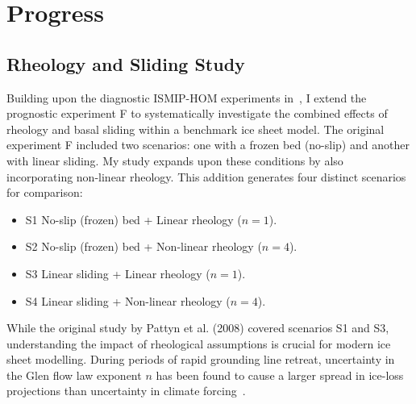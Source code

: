 \chapter{Progress}\label{progress}
\section{Rheology and Sliding Study}\label{study1}
Building upon the diagnostic ISMIP-HOM experiments in~\cite{Pattyn_2008}, I extend the prognostic experiment F to systematically investigate the combined effects of rheology and basal sliding within a benchmark ice sheet model. The original experiment F included two scenarios: one with a frozen bed (no-slip) and another with linear sliding.
My study expands upon these conditions by also incorporating non-linear rheology. This addition generates four distinct scenarios for comparison:
\begin{itemize}
\item{S1} No-slip (frozen) bed + Linear rheology ($n=1$).
\item{S2} No-slip (frozen) bed + Non-linear rheology ($n=4$).
\item{S3} Linear sliding + Linear rheology ($n=1$).
\item{S4} Linear sliding + Non-linear rheology ($n=4$).
\end{itemize}
While the original study by Pattyn et al. (2008) covered scenarios S1 and S3, understanding the impact of rheological assumptions is crucial for modern ice sheet modelling. During periods of rapid grounding line retreat, uncertainty in the Glen flow law exponent $n$ has been found to cause a larger spread in ice-loss projections than uncertainty in climate forcing~\cite{Getraer_2025}.

